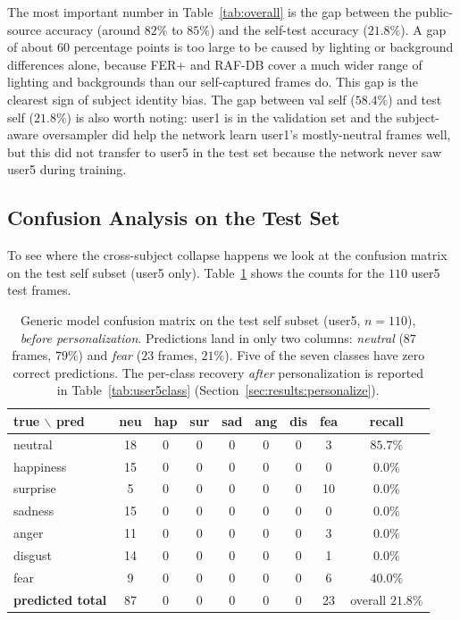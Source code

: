 \documentclass[12pt,a4paper]{article}
\begin{document}
The most important number in Table~\ref{tab:overall} is the
gap between the public-source accuracy (around $82\%$ to $85\%$)
and the self-test accuracy ($21.8\%$). A gap of about
$60$ percentage points is too large to be caused by lighting or
background differences alone, because FER+ and RAF-DB cover a
much wider range of lighting and backgrounds than our
self-captured frames do. This gap is the clearest sign of
subject identity bias. The gap between val self ($58.4\%$) and
test self ($21.8\%$) is also worth noting: user1 is in the
validation set and the subject-aware oversampler did help the
network learn user1's mostly-neutral frames well, but this did
not transfer to user5 in the test set because the network never
saw user5 during training.

\subsection{Confusion Analysis on the Test Set}
\label{sec:results:confusion}

To see where the cross-subject collapse happens we look at the
confusion matrix on the test self subset (user5 only).
Table~\ref{tab:selfconf} shows the counts for the $110$ user5
test frames.

\begin{table}[H]
  \centering
  \footnotesize
  \begin{tabular}{l|ccccccc|c}
    \toprule
    true $\backslash$ pred & neu & hap & sur & sad & ang & dis & fea & recall \\
    \midrule
    neutral   & 18 & 0 & 0 & 0 & 0 & 0 & 3  & $85.7\%$ \\
    happiness & 15 & 0 & 0 & 0 & 0 & 0 & 0  & $0.0\%$ \\
    surprise  & 5  & 0 & 0 & 0 & 0 & 0 & 10 & $0.0\%$ \\
    sadness   & 15 & 0 & 0 & 0 & 0 & 0 & 0  & $0.0\%$ \\
    anger     & 11 & 0 & 0 & 0 & 0 & 0 & 3  & $0.0\%$ \\
    disgust   & 14 & 0 & 0 & 0 & 0 & 0 & 1  & $0.0\%$ \\
    fear      & 9  & 0 & 0 & 0 & 0 & 0 & 6  & $40.0\%$ \\
    \midrule
    \textbf{predicted total} & 87 & 0 & 0 & 0 & 0 & 0 & 23 & overall $21.8\%$ \\
    \bottomrule
  \end{tabular}
  \caption{Generic model confusion matrix on the test self
  subset (user5, $n=110$), \emph{before personalization}.
  Predictions land in only two columns: \emph{neutral}
  ($87$ frames, $79\%$) and \emph{fear} ($23$ frames, $21\%$).
  Five of the seven classes have zero correct predictions.
  The per-class recovery \emph{after} personalization is
  reported in Table~\ref{tab:user5class}
  (Section~\ref{sec:results:personalize}).}
  \label{tab:selfconf}
\end{table}
\end{document}
